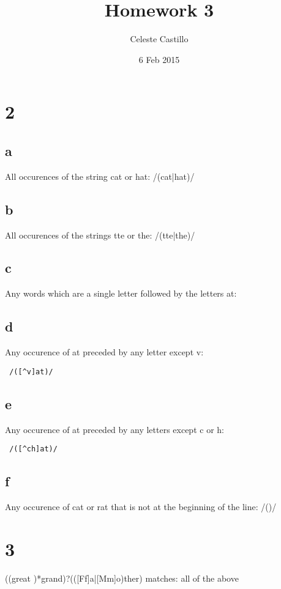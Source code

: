 \documentclass{article}
\title{Homework 3}
\author{Celeste Castillo}
\date{6 Feb 2015}
\begin{document}
\section{2}
\subsection{a}

All occurences of the string cat or hat: /(cat|hat)/

\subsection{b}

All occurences of the strings tte or the: /(tte|the)/

\subsection{c}

Any words which are a single letter followed by the letters at:

\subsection{d}

Any occurence of at preceded by any letter except v: \begin{verbatim} /([^v]at)/ \end{verbatim}

\subsection{e}

Any occurence of at preceded by any letters except c or h: \begin{verbatim} /([^ch]at)/ \end{verbatim}

\subsection{f}

Any occurence of cat or rat that is not at the beginning of the line: /()/

\section{3}

((great )*grand)?(([Ff]a|[Mm]o)ther) matches: all of the above
\end{document}
